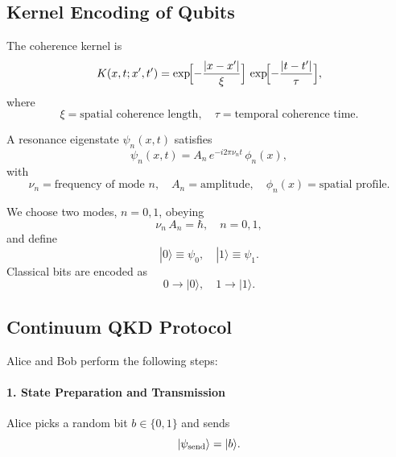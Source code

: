\subsection{Kernel Encoding of Qubits}

\begin{definition}
The coherence kernel is
\begin{equation}\label{eq:kernel_def_crypto}
K(x,t; x',t')
= \exp\!\Bigl[-\frac{|x - x'|}{\xi}\Bigr]\,
  \exp\!\Bigl[-\frac{|t - t'|}{\tau}\Bigr],
\end{equation}
where 
\[
\xi = \text{spatial coherence length}, 
\quad
\tau = \text{temporal coherence time}.
\]
\end{definition}

A resonance eigenstate $\psi_n(x,t)$ satisfies
\begin{equation}\label{eq:resonance_state}
\psi_n(x,t) = A_n\,e^{-i2\pi\nu_n t}\,\phi_n(x),
\end{equation}
with
\[
\nu_n = \text{frequency of mode }n,\quad
A_n = \text{amplitude},\quad
\phi_n(x) = \text{spatial profile}.
\]

\begin{definition}
We choose two modes, \(n=0,1\), obeying
\begin{equation}\label{eq:crypto_qubit_quant}
\nu_n\,A_n = \hbar,\quad n=0,1,
\end{equation}
and define
\begin{equation}\label{eq:crypto_qubit_basis}
|0\rangle \equiv \psi_0,\quad
|1\rangle \equiv \psi_1.
\end{equation}
Classical bits are encoded as
\[
0\to|0\rangle,\quad 1\to|1\rangle.
\]
\end{definition}

\subsection{Continuum QKD Protocol}

Alice and Bob perform the following steps:

\paragraph{1. State Preparation and Transmission}  
Alice picks a random bit \(b\in\{0,1\}\) and sends
\begin{equation}\label{eq:send_state}
|\psi_{\rm send}\rangle = |b\rangle.
\end{equation}

